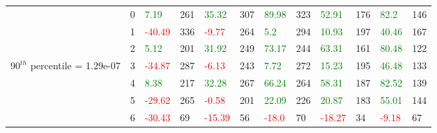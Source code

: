 \begin{table}[htb!]
\begin{adjustwidth}{-0.9in}{-0.9in}
\begin{tabular}{|p{5em}|p{2em}|p{3em}|p{3em}|p{3em}|p{3em}|p{3em}|p{3em}|p{3em}|p{3em}|p{3em}|p{3em}|}
            & 0 & \textcolor{green}{7.19} & 261 & \textcolor{green}{35.32} & 307 & \textcolor{green}{89.98} & 323 & \textcolor{green}{52.91} & 176 & \textcolor{green}{82.2} & 146\\\cline{3-12}
            & 1 & \textcolor{red}{-40.49} & 336 & \textcolor{red}{-9.77} & 264 & \textcolor{green}{5.2} & 294 & \textcolor{green}{10.93} & 197 & \textcolor{green}{40.46} & 167\\\cline{3-12}
            & 2 & \textcolor{green}{5.12} & 201 & \textcolor{green}{31.92} & 249 & \textcolor{green}{73.17} & 244 & \textcolor{green}{63.31} & 161 & \textcolor{green}{80.48} & 122\\\cline{3-12}
            $90^{th}$ percentile = 1.29e-07 & 3 & \textcolor{red}{-34.87} & 287 & \textcolor{red}{-6.13} & 243 & \textcolor{green}{7.72} & 272 & \textcolor{green}{15.23} & 195 & \textcolor{green}{46.48} & 133\\[-5.5ex]\cline{3-12}
            & 4 & \textcolor{green}{8.38} & 217 & \textcolor{green}{32.28} & 267 & \textcolor{green}{66.24} & 264 & \textcolor{green}{58.31} & 187 & \textcolor{green}{82.52} & 139\\\cline{3-12}
            & 5 & \textcolor{red}{-29.62} & 265 & \textcolor{red}{-0.58} & 201 & \textcolor{green}{22.09} & 226 & \textcolor{green}{20.87} & 183 & \textcolor{green}{55.01} & 144\\\cline{3-12}
            & 6 & \textcolor{red}{-30.43} & 69 & \textcolor{red}{-15.39} & 56 & \textcolor{red}{-18.0} & 70 & \textcolor{red}{-18.27} & 34 & \textcolor{red}{-9.18} & 67\\\hline\hline


\end{tabular}
\end{adjustwidth}
\end{table}
